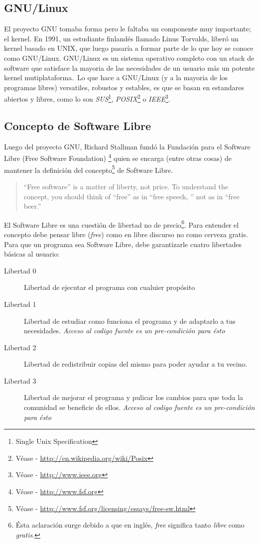 \subsection{GNU/Linux}
El proyecto GNU tomaba forma pero le faltaba un componente muy importante; el
kernel. 
En 1991, un estudiante finland\'es llamado Linus Torvalds, liber\'o un kernel
basado en UNIX, que luego pasar\'ia a formar parte de lo que hoy se conoce como
GNU/Linux.
GNU/Linux es un sistema operativo completo con un stack de software que
satisface la mayoria de las necesidades de un usuario m\'as un potente kernel
mutiplataforma.\
Lo que hace a GNU/Linux (y a la mayoria de los programas libres) versatiles,
robustos y estables, es que se basan en estandares abiertos y libres, como lo
son \emph{SUS}\footnote{Single Unix Specification},
\emph{POSIX}\footnote{V\'ease - \url{http://en.wikipedia.org/wiki/Posix}} o
\emph{IEEE}\footnote{V\'ease - \url{http://www.ieee.org}}.

\subsection{Concepto de Software Libre}
Luego del proyecto GNU, Richard Stallman fund\'o la Fundaci\'on para el 
Software Libre (Free Software Foundation)
\footnote{V\'ease - \url{http://www.fsf.org}} quien se encarga (entre otras
cosas) de
mantener la definici\'on del concepto\footnote{V\'ease -
\url{http://www.fsf.org/licensing/essays/free-sw.html}} de Software Libre.

\begin{quote}
``Free software'' is a matter of liberty, not price. 
To understand the concept, you should think of ``free'' as in ``free speech,
'' not as in ``free beer.''
\end{quote}

El Software Libre es una cuesti\'on de libertad no de precio\footnote{\'Esta
aclaraci\'on surge debido a que en ingl\'es, \emph{free} significa tanto
\emph{libre} como \emph{gratis}.}. Para entender el concepto debe pensar libre
(\emph{free}) como en libre discurso no como cerveza gratis.\\

Para que un programa sea Software Libre, debe garantizarle cuatro libertades
b\'asicas al usuario:

\begin{description}
\item[Libertad 0] Libertad de ejecutar el programa con cualuier prop\'osito
\item[Libertad 1] Libertad de estudiar como funciona el programa y de
adaptarlo
a tus necesidades. \emph{Acceso al codigo fuente es un pre-condici\'on para
\'esto}
\item[Libertad 2] Libertad de redistribuir copias del mismo para poder ayudar
a tu vecino.
\item[Libertad 3] Libertad de mejorar el programa y pulicar los cambios para
que toda la comunidad se beneficie de ellos. \emph{Acceso al codigo fuente es 
un pre-condici\'on para \'esto}
\end{description}


